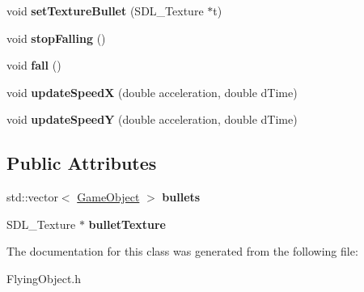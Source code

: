 \begin{DoxyCompactItemize}
\item 
\hypertarget{class_flying_object_a7fe6ad261feebe138e7b0aa505cde139}{}void {\bfseries set\+Texture\+Bullet} (S\+D\+L\+\_\+\+Texture $\ast$t)\label{class_flying_object_a7fe6ad261feebe138e7b0aa505cde139}

\item 
\hypertarget{class_flying_object_ad6df1d7fc43370822a889519328b2e58}{}void {\bfseries stop\+Falling} ()\label{class_flying_object_ad6df1d7fc43370822a889519328b2e58}

\item 
\hypertarget{class_flying_object_aaccd1a04a85a36e0481234a9800cae9f}{}void {\bfseries fall} ()\label{class_flying_object_aaccd1a04a85a36e0481234a9800cae9f}

\item 
\hypertarget{class_flying_object_ad5df5f8b0caed1b1437e033b9c83dd6e}{}void {\bfseries update\+Speed\+X} (double acceleration, double d\+Time)\label{class_flying_object_ad5df5f8b0caed1b1437e033b9c83dd6e}

\item 
\hypertarget{class_flying_object_a8ce65d5d92854d92d456f050b8187d0a}{}void {\bfseries update\+Speed\+Y} (double acceleration, double d\+Time)\label{class_flying_object_a8ce65d5d92854d92d456f050b8187d0a}

\end{DoxyCompactItemize}
\subsection*{Public Attributes}
\begin{DoxyCompactItemize}
\item 
\hypertarget{class_flying_object_a350b186c309d32d0de570c7a2d57ac81}{}std\+::vector$<$ \hyperlink{class_game_object}{Game\+Object} $>$ {\bfseries bullets}\label{class_flying_object_a350b186c309d32d0de570c7a2d57ac81}

\item 
\hypertarget{class_flying_object_a321b6cbde4049c3b92025b91d6d55353}{}S\+D\+L\+\_\+\+Texture $\ast$ {\bfseries bullet\+Texture}\label{class_flying_object_a321b6cbde4049c3b92025b91d6d55353}

\end{DoxyCompactItemize}


The documentation for this class was generated from the following file\+:\begin{DoxyCompactItemize}
\item 
Flying\+Object.\+h\end{DoxyCompactItemize}
